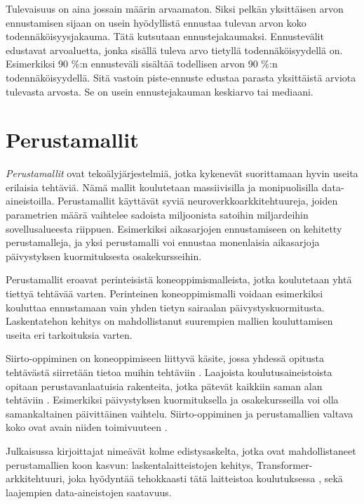 Tulevaisuus on aina jossain määrin arvaamaton. Siksi pelkän yksittäisen arvon ennustamisen sijaan on usein hyödyllistä ennustaa tulevan arvon koko todennäköisyysjakauma. Tätä kutsutaan ennustejakaumaksi. Ennustevälit edustavat arvoaluetta, jonka sisällä tuleva arvo tietyllä todennäköisyydellä on. Esimerkiksi 90 \%:n ennusteväli sisältää todellisen arvon 90 \%:n todennäköisyydellä. Sitä vastoin piste-ennuste edustaa parasta yksittäistä arviota tulevasta arvosta. Se on usein ennustejakauman keskiarvo tai mediaani. \cite{hyndman2018forecasting}

\section*{Perustamallit}

\emph{Perustamallit} ovat tekoälyjärjestelmiä, jotka kykenevät suorittamaan hyvin useita erilaisia tehtäviä. Nämä mallit koulutetaan massiivisilla ja monipuolisilla data-aineistoilla. Perustamallit käyttävät syviä neuroverkkoarkkitehtuureja, joiden parametrien määrä vaihtelee sadoista miljoonista satoihin miljardeihin sovellusalueesta riippuen. \cite{bommasani2022opportunitiesrisksfoundationmodels} Esimerkiksi aikasarjojen ennustamiseen on kehitetty perustamalleja, ja yksi perustamalli voi ennustaa monenlaisia aikasarjoja päivystyksen kuormituksesta osakekursseihin.

Perustamallit eroavat perinteisistä koneoppimismalleista, jotka koulutetaan yhtä tiettyä tehtävää varten. Perinteinen koneoppimismalli voidaan esimerkiksi kouluttaa ennustamaan vain yhden tietyn sairaalan päivystyskuormitusta. Laskentatehon kehitys on mahdollistanut suurempien mallien kouluttamisen useita eri tarkoituksia varten. \cite{bommasani2022opportunitiesrisksfoundationmodels}

Siirto-oppiminen on koneoppimiseen liittyvä käsite, jossa yhdessä opitusta tehtävästä siirretään tietoa muihin tehtäviin \cite{Raffel2020T5}. Laajoista koulutusaineistoista opitaan perustavanlaatuisia rakenteita, jotka pätevät kaikkiin saman alan tehtäviin \cite{Raffel2020T5}. Esimerkiksi päivystyksen kuormituksella ja osakekursseilla voi olla samankaltainen päivittäinen vaihtelu. Siirto-oppiminen ja perustamallien valtava koko ovat avain niiden toimivuuteen \cite{bommasani2022opportunitiesrisksfoundationmodels}.

Julkaisussa \cite{bommasani2022opportunitiesrisksfoundationmodels} kirjoittajat nimeävät kolme edistysaskelta, jotka ovat mahdollistaneet perustamallien koon kasvun: laskentalaitteistojen kehitys, Transformer-arkkitehtuuri, joka hyödyntää tehokkaasti tätä laitteistoa koulutuksessa \cite{vaswani_attention_2017}, sekä laajempien data-aineistojen saatavuus.

